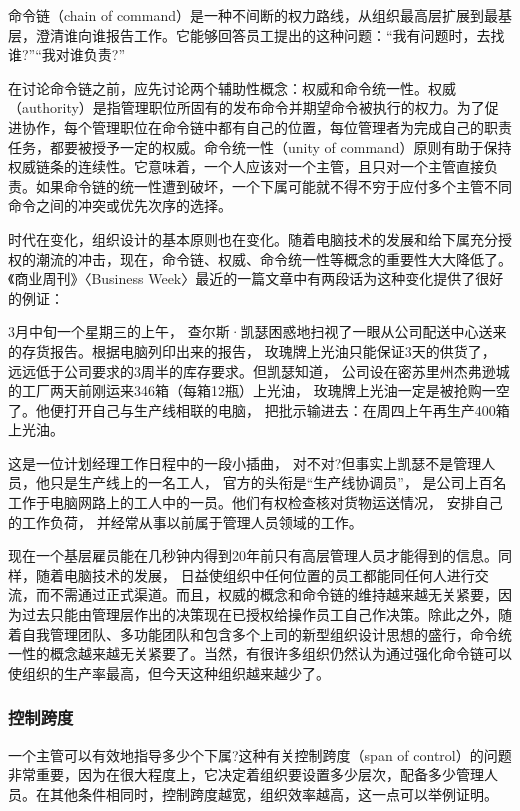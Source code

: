     命令链（chain of command）是一种不间断的权力路线，从组织最高层扩展到最基层，澄清谁向谁报告工作。它能够回答员工提出的这种问题：“我有问题时，去找谁?”“我对谁负责?”

    在讨论命令链之前，应先讨论两个辅助性概念：权威和命令统一性。权威（authority）是指管理职位所固有的发布命令并期望命令被执行的权力。为了促进协作，每个管理职位在命令链中都有自己的位置，每位管理者为完成自己的职责任务，都要被授予一定的权威。命令统一性（unity of command）原则有助于保持权威链条的连续性。它意味着，一个人应该对一个主管，且只对一个主管直接负责。如果命令链的统一性遭到破坏，一个下属可能就不得不穷于应付多个主管不同命令之间的冲突或优先次序的选择。

    时代在变化，组织设计的基本原则也在变化。随着电脑技术的发展和给下属充分授权的潮流的冲击，现在，命令链、权威、命令统一性等概念的重要性大大降低了。《商业周刊》〈Business Week〉最近的一篇文章中有两段话为这种变化提供了很好的例证：

    3月中旬一个星期三的上午， 查尔斯·凯瑟困惑地扫视了一眼从公司配送中心送来的存货报告。根据电脑列印出来的报告， 玫瑰牌上光油只能保证3天的供货了， 远远低于公司要求的3周半的库存要求。但凯瑟知道， 公司设在密苏里州杰弗逊城的工厂两天前刚运来346箱（每箱12瓶）上光油， 玫瑰牌上光油一定是被抢购一空了。他便打开自己与生产线相联的电脑， 把批示输进去：在周四上午再生产400箱上光油。

    这是一位计划经理工作日程中的一段小插曲， 对不对?但事实上凯瑟不是管理人员，他只是生产线上的一名工人， 官方的头衔是“生产线协调员”， 是公司上百名工作于电脑网路上的工人中的一员。他们有权检查核对货物运送情况， 安排自己的工作负荷， 并经常从事以前属于管理人员领域的工作。

    现在一个基层雇员能在几秒钟内得到20年前只有高层管理人员才能得到的信息。同样，随着电脑技术的发展， 日益使组织中任何位置的员工都能同任何人进行交流，而不需通过正式渠道。而且，权威的概念和命令链的维持越来越无关紧要，因为过去只能由管理层作出的决策现在已授权给操作员工自己作决策。除此之外，随着自我管理团队、多功能团队和包含多个上司的新型组织设计思想的盛行，命令统一性的概念越来越无关紧要了。当然，有很许多组织仍然认为通过强化命令链可以使组织的生产率最高，但今天这种组织越来越少了。

    \subsubsection {控制跨度}

    一个主管可以有效地指导多少个下属?这种有关控制跨度（span of control）的问题非常重要，因为在很大程度上，它决定着组织要设置多少层次，配备多少管理人员。在其他条件相同时，控制跨度越宽，组织效率越高，这一点可以举例证明。

